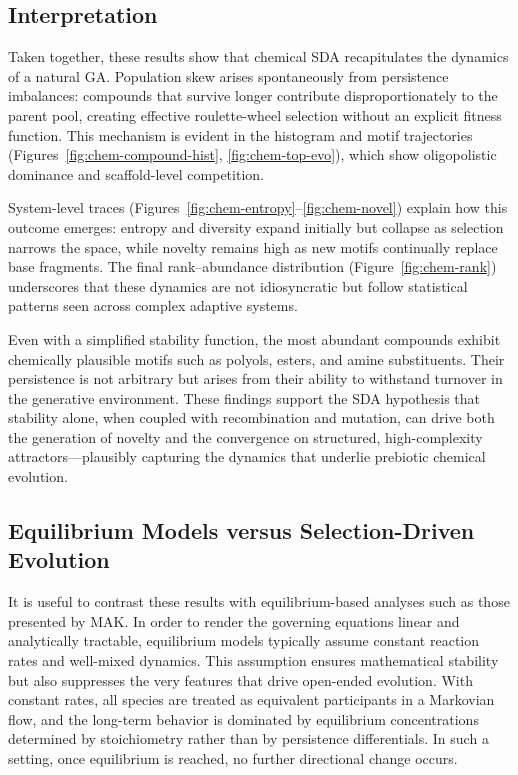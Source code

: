 \documentclass[life,article,submit,pdftex,moreauthors]{Definitions/mdpi}
\begin{document}
\subsection{Interpretation}

Taken together, these results show that chemical SDA recapitulates the dynamics of a natural GA. Population skew arises spontaneously from persistence imbalances: compounds that survive longer contribute disproportionately to the parent pool, creating effective roulette-wheel selection without an explicit fitness function. This mechanism is evident in the histogram and motif trajectories (Figures~\ref{fig:chem-compound-hist}, \ref{fig:chem-top-evo}), which show oligopolistic dominance and scaffold-level competition.  

System-level traces (Figures~\ref{fig:chem-entropy}--\ref{fig:chem-novel}) explain how this outcome emerges: entropy and diversity expand initially but collapse as selection narrows the space, while novelty remains high as new motifs continually replace base fragments. The final rank–abundance distribution (Figure~\ref{fig:chem-rank}) underscores that these dynamics are not idiosyncratic but follow statistical patterns seen across complex adaptive systems.  

Even with a simplified stability function, the most abundant compounds exhibit chemically plausible motifs such as polyols, esters, and amine substituents. Their persistence is not arbitrary but arises from their ability to withstand turnover in the generative environment. These findings support the SDA hypothesis that stability alone, when coupled with recombination and mutation, can drive both the generation of novelty and the convergence on structured, high-complexity attractors—plausibly capturing the dynamics that underlie prebiotic chemical evolution.  


\subsection{Equilibrium Models versus Selection-Driven Evolution}

It is useful to contrast these results with equilibrium-based analyses such as those presented by MAK. In order to render the governing equations linear and analytically tractable, equilibrium models typically assume constant reaction rates and well-mixed dynamics. This assumption ensures mathematical stability but also suppresses the very features that drive open-ended evolution. With constant rates, all species are treated as equivalent participants in a Markovian flow, and the long-term behavior is dominated by equilibrium concentrations determined by stoichiometry rather than by persistence differentials. In such a setting, once equilibrium is reached, no further directional change occurs.
\end{document}
